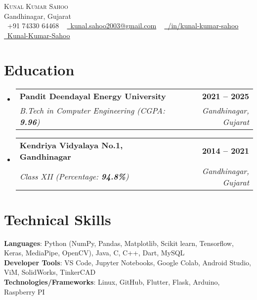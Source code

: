 \documentclass[letterpaper,11pt]{article}
\makeatletter
\newcommand{\resumeSubheading}[4]{
  \vspace{-2pt}\item
    \begin{tabular*}{1.0\textwidth}[t]{l@{\extracolsep{\fill}}r}
      \textbf{#1} & \textbf{\small #2} \\
      \textit{\small#3} & \textit{\small #4} \\
    \end{tabular*}\vspace{-7pt}
}
\newcommand{\resumeSubHeadingListStart}{\begin{itemize}[leftmargin=0.0in, label={}]}
\newcommand{\resumeSubHeadingListEnd}{\end{itemize}}
\makeatother
\begin{document}

\begin{center}
    {\Huge \scshape Kunal Kumar Sahoo} \\ \vspace{1pt}
    Gandhinagar, Gujarat \\ \vspace{1pt}
    \small \raisebox{-0.1\height}\faPhone\ +91 74330 64468 ~ \href{mailto:kunal.sahoo2003@gmail.com}{\raisebox{-0.2\height}\faEnvelope\  \underline{kunal.sahoo2003@gmail.com}} ~ 
    \href{https://linkedin.com/in//}{\raisebox{-0.2\height}\faLinkedin\ \underline{/in/kunal-kumar-sahoo}}  ~
    \href{https://github.com/}{\raisebox{-0.2\height}\faGithub\ \underline{Kunal-Kumar-Sahoo}}
    \vspace{-8pt}
\end{center}


\section{Education}
  \resumeSubHeadingListStart
    \resumeSubheading
      {Pandit Deendayal Energy University}{2021 -- 2025}
      {B.Tech in Computer Engineering (CGPA: \textbf{9.96})}{Gandhinagar, Gujarat}
    \resumeSubheading  
      {Kendriya Vidyalaya No.1, Gandhinagar}{2014 -- 2021}
      {Class XII (Percentage: \textbf{94.8\%})}{Gandhinagar, Gujarat}
  \resumeSubHeadingListEnd

\section{Technical Skills}
 \begin{itemize}[leftmargin=0.15in, label={}]
    \small{\item{
     \textbf{Languages}{: Python (NumPy, Pandas, Matplotlib, Scikit learn, Tensorflow, Keras, MediaPipe, OpenCV), Java, C, C++, Dart, MySQL} \\
     \textbf{Developer Tools}{: VS Code, Jupyter Notebooks, Google Colab, Android Studio, ViM, SolidWorks, TinkerCAD} \\
     \textbf{Technologies/Frameworks}{: Linux, GitHub, Flutter, Flask, Arduino, Raspberry PI} \\
    }}
 \end{itemize}
 \vspace{-16pt}
\end{document}
